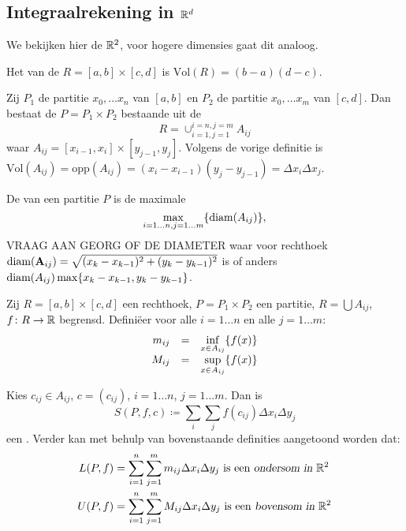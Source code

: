 \documentclass{2wa40summary}
\newcommand\ds{\displaystyle}
\def\diam{\text{diam}}
\begin{document}
		\subsection{Integraalrekening in $\mathbb{R}^d$}
			We bekijken hier de $\reals^2$, voor hogere dimensies gaat dit analoog.
			\begin{define}
				Het  van de  $R =[a,b]\times[c,d]$ is  $\text{Vol}(R) = (b-a)(d-c)$.
			\end{define}
\begin{theorem}
Zij $P_1$ de partitie $x_0,\ldots x_n$ van $[a,b]$ en
$P_2$ de partitie $x_0,\ldots x_m$ van $[c,d]$.
Dan bestaat de  $P=P_1 \times P_2$ bestaande uit de 
\[
R = \cup_{i=1,j=1}^{i=n,j=m} A_{ij}
\]
waar $A_{ij}=[x_{i-1},x_i] \times [y_{j-1},y_j]$.
Volgens de vorige definitie is $\text{Vol}(A_{ij})=\text{opp}(A_{ij})=(x_i-x_{i-1})(y_j-y_{j-1}) = \Delta x_i \Delta x_j$.
\end{theorem}
			\begin{define}
				De  van een partitie $P$ is de maximale \indx{diameter}
\[
\max_{i=1\ldots n,j=1\ldots m}\set{\diam(A_{ij})},
\]
VRAAG AAN GEORG OF DE DIAMETER waar voor rechthoek $\diam(\A_{ij})=\sqrt{(x_k-x_{k-1})^2 + (y_k-y_{k-1})^2}$ is of anders $\diam(A_{ij})\max\set{x_k-x_{k-1},y_k-y_{k-1}}$.
			\end{define}
			\begin{define}
				Zij $R=[a,b]\times[c,d]$ een rechthoek, $P=P_1 \times P_2$ een partitie, $R=\bigcup A_{ij}$, $f\colon R \to \mathbb{R}$ begrensd.
				Defini\"eer voor alle $i=1 \ldots n$ en alle $j=1 \ldots m$:
				\[
					\begin{array}{rcl}
						m_{ij} &=& \ds\inf_{x \in A_{ij}}\set{f(x)}\\
						M_{ij} &=& \ds\sup_{x \in A_{ij}}\set{f(x)}
					\end{array}
				\]
			\end{define}
			\begin{define}
				Kies $c_{ij} \in A_{ij}$, $c=(c_{ij})$, $i=1 \ldots n$, $j=1 \ldots m$. Dan is 
				\[ 
					S(P,f,c) \coloneqq  \sum_i \sum_j f(c_{ij}) \Delta x_i \Delta y_j
				 \]
				 een \indx{Riemannsom in $\reals^2$}.
Verder kan met behulp van bovenstaande definities aangetoond worden dat:
				\begin{align*}
					L(P,f) &= \sum_{i=1}^{n} \sum_{j=1}^{m} m_{ij} \Delta x_i \Delta y_j \text{ is een \indx{ondersom in $\reals^2$}} \\
					U(P,f) &= \sum_{i=1}^{n} \sum_{j=1}^{m} M_{ij} \Delta x_i \Delta y_j \text{ is een \indx{bovensom in $\reals^2$}}
				 \end{align*}
				 
			\end{define}
\end{document}
